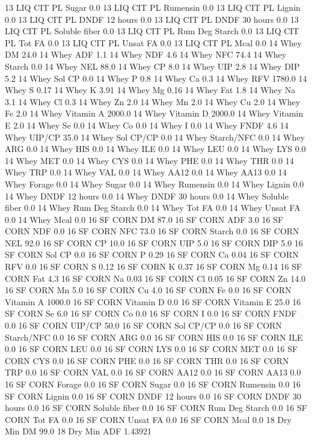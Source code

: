 \documentclass[letterpaper,10pt,english]{sphinxmanual}
\begin{document}
\begin{sphinxVerbatim}[commandchars=\\\{\},numbers=left,firstnumber=1,stepnumber=1]
13 LIQ CIT PL Sugar \PYGZpc{} 0.0
13 LIQ CIT PL Rumensin 0.0
13 LIQ CIT PL Lignin 0.0
13 LIQ CIT PL DNDF 12 hours 0.0
13 LIQ CIT PL DNDF 30 hours 0.0
13 LIQ CIT PL Soluble fiber 0.0
13 LIQ CIT PL Rum Deg Starch 0.0
13 LIQ CIT PL Tot FA 0.0
13 LIQ CIT PL Unsat FA 0.0
13 LIQ CIT PL Mcal 0.0
14 Whey DM 24.0
14 Whey ADF 1.1
14 Whey NDF 4.6
14 Whey NFC 74.4
14 Whey Starch 0.0
14 Whey NEL 88.0
14 Whey CP 8.0
14 Whey UIP 2.8
14 Whey DIP 5.2
14 Whey Sol CP 0.0
14 Whey P 0.8
14 Whey Ca 0.3
14 Whey RFV 1780.0
14 Whey S 0.17
14 Whey K 3.91
14 Whey Mg 0.16
14 Whey Fat 1.8
14 Whey Na 3.1
14 Whey Cl 0.3
14 Whey Zn 2.0
14 Whey Mn 2.0
14 Whey Cu 2.0
14 Whey Fe 2.0
14 Whey Vitamin A 2000.0
14 Whey Vitamin D 2000.0
14 Whey Vitamin E 2.0
14 Whey Se 0.0
14 Whey Co 0.0
14 Whey I 0.0
14 Whey FNDF 4.6
14 Whey UIP/CP 35.0
14 Whey Sol CP/CP 0.0
14 Whey Starch/NFC 0.0
14 Whey ARG 0.0
14 Whey HIS 0.0
14 Whey ILE 0.0
14 Whey LEU 0.0
14 Whey LYS 0.0
14 Whey MET 0.0
14 Whey CYS 0.0
14 Whey PHE 0.0
14 Whey THR 0.0
14 Whey TRP 0.0
14 Whey VAL 0.0
14 Whey AA\PYGZsh{}12 0.0
14 Whey AA\PYGZsh{}13 0.0
14 Whey \PYGZpc{} Forage 0.0
14 Whey Sugar \PYGZpc{} 0.0
14 Whey Rumensin 0.0
14 Whey Lignin 0.0
14 Whey DNDF 12 hours 0.0
14 Whey DNDF 30 hours 0.0
14 Whey Soluble fiber 0.0
14 Whey Rum Deg Starch 0.0
14 Whey Tot FA 0.0
14 Whey Unsat FA 0.0
14 Whey Mcal 0.0
16 SF CORN DM 87.0
16 SF CORN ADF 3.0
16 SF CORN NDF 0.0
16 SF CORN NFC 73.0
16 SF CORN Starch 0.0
16 SF CORN NEL 92.0
16 SF CORN CP 10.0
16 SF CORN UIP 5.0
16 SF CORN DIP 5.0
16 SF CORN Sol CP 0.0
16 SF CORN P 0.29
16 SF CORN Ca 0.04
16 SF CORN RFV 0.0
16 SF CORN S 0.12
16 SF CORN K 0.37
16 SF CORN Mg 0.14
16 SF CORN Fat 4.3
16 SF CORN Na 0.03
16 SF CORN Cl 0.05
16 SF CORN Zn 14.0
16 SF CORN Mn 5.0
16 SF CORN Cu 4.0
16 SF CORN Fe 0.0
16 SF CORN Vitamin A 1000.0
16 SF CORN Vitamin D 0.0
16 SF CORN Vitamin E 25.0
16 SF CORN Se 6.0
16 SF CORN Co 0.0
16 SF CORN I 0.0
16 SF CORN FNDF 0.0
16 SF CORN UIP/CP 50.0
16 SF CORN Sol CP/CP 0.0
16 SF CORN Starch/NFC 0.0
16 SF CORN ARG 0.0
16 SF CORN HIS 0.0
16 SF CORN ILE 0.0
16 SF CORN LEU 0.0
16 SF CORN LYS 0.0
16 SF CORN MET 0.0
16 SF CORN CYS 0.0
16 SF CORN PHE 0.0
16 SF CORN THR 0.0
16 SF CORN TRP 0.0
16 SF CORN VAL 0.0
16 SF CORN AA\PYGZsh{}12 0.0
16 SF CORN AA\PYGZsh{}13 0.0
16 SF CORN \PYGZpc{} Forage 0.0
16 SF CORN Sugar \PYGZpc{} 0.0
16 SF CORN Rumensin 0.0
16 SF CORN Lignin 0.0
16 SF CORN DNDF 12 hours 0.0
16 SF CORN DNDF 30 hours 0.0
16 SF CORN Soluble fiber 0.0
16 SF CORN Rum Deg Starch 0.0
16 SF CORN Tot FA 0.0
16 SF CORN Unsat FA 0.0
16 SF CORN Mcal 0.0
18 Dry Min DM 99.0
18 Dry Min ADF 1.43921

\end{sphinxVerbatim}
\end{document}
